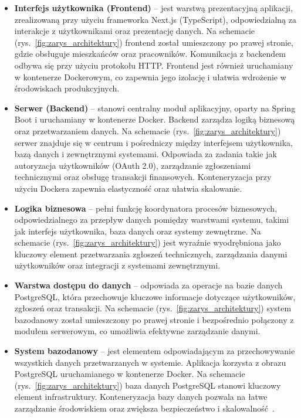 \begin{itemize}

    \item \textbf{Interfejs użytkownika (Frontend)} – jest warstwą prezentacyjną aplikacji, zrealizowaną przy użyciu frameworka Next.js (TypeScript), odpowiedzialną za interakcje z użytkownikami oraz prezentację danych. Na schemacie (rys.~\ref{fig:zarys_architektury}) frontend został umieszczony po prawej stronie, gdzie obsługuje mieszkańców oraz pracowników. Komunikacja z backendem odbywa się przy użyciu protokołu HTTP. Frontend jest również uruchamiany w kontenerze Dockerowym, co zapewnia jego izolację i ułatwia wdrożenie w środowiskach produkcyjnych.

    \item \textbf{Serwer (Backend)} – stanowi centralny moduł aplikacyjny, oparty na Spring Boot i uruchamiany w kontenerze Docker. Backend zarządza logiką biznesową oraz przetwarzaniem danych. Na schemacie (rys.~\ref{fig:zarys_architektury}) serwer znajduje się w centrum i pośredniczy między interfejsem użytkownika, bazą danych i zewnętrznymi systemami. Odpowiada za zadania takie jak autoryzacja użytkowników (OAuth 2.0), zarządzanie zgłoszeniami technicznymi oraz obsługę transakcji finansowych. Konteneryzacja przy użyciu Dockera zapewnia elastyczność oraz ułatwia skalowanie.

    \item \textbf{Logika biznesowa} – pełni funkcję koordynatora procesów biznesowych, odpowiedzialnego za przepływ danych pomiędzy warstwami systemu, takimi jak interfejs użytkownika, baza danych oraz systemy zewnętrzne. Na schemacie (rys.~\ref{fig:zarys_architektury}) jest wyraźnie wyodrębniona jako kluczowy element przetwarzania zgłoszeń technicznych, zarządzania danymi użytkowników oraz integracji z systemami zewnętrznymi.

    \item \textbf{Warstwa dostępu do danych} – odpowiada za operacje na bazie danych PostgreSQL, która przechowuje kluczowe informacje dotyczące użytkowników, zgłoszeń oraz transakcji. Na schemacie (rys.~\ref{fig:zarys_architektury}) system bazodanowy został umieszczony po prawej stronie i bezpośrednio połączony z modułem serwerowym, co umożliwia efektywne zarządzanie danymi.

    \item \textbf{System bazodanowy} – jest elementem odpowiadającym za przechowywanie wszystkich danych przetwarzanych w systemie. Aplikacja korzysta z obrazu PostgreSQL uruchamianego w kontenerze Docker. Na schemacie (rys.~\ref{fig:zarys_architektury}) baza danych PostgreSQL stanowi kluczowy element infrastruktury. Konteneryzacja bazy danych pozwala na łatwe zarządzanie środowiskiem oraz zwiększa bezpieczeństwo i skalowalność~\cite{Docker-docs,vsupalov}.


\end{itemize}
